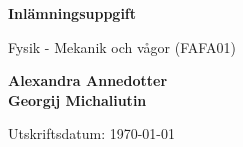 
\setcounter{figure}{0} %
\setcounter{equation}{0} %
\setcounter{lstlisting}{0} %

\begin{center}
    \vspace*{1cm}
    \LARGE
    \textbf{Inlämningsuppgift }
    
    \Large
    \vspace{0.5cm}
        Fysik - Mekanik och vågor (FAFA01)
    \vspace{0.7cm}
    
    \normalsize
    \textbf{Alexandra Annedotter}
    \\
    \textbf{Georgij Michaliutin}
    
    \vspace{0.5cm}
    Utskriftsdatum: \today
 
    \vspace{1cm}
\end{center}